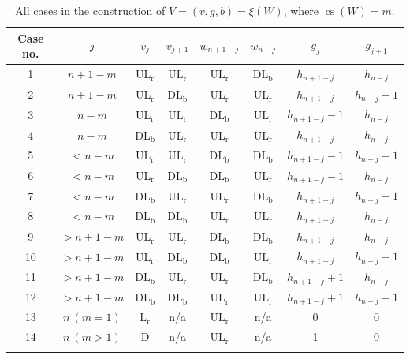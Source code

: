 \documentclass[12pt,reqno]{amsart}
\numberwithin{equation}{section}
\theoremstyle{plain}
\theoremstyle{definition}
\def\rD{\operatorname{D}}
\def\rLr{\operatorname{L_r}}
\def\ULr{\operatorname{UL_r}}
\def\DLb{\operatorname{DL_b}}
\def\cs{\operatorname{cs}}
\begin{document}
\renewcommand{\arraystretch}{1.4}
\begin{table}
{\small
\begin{tabular}{cccccccc}
\toprule
Case no. & $j$ & $v_j$ & $v_{j+1}$ & $w_{n+1-j}$ & $w_{n-j}$ & $g_j$ & $g_{j+1}$\\
\midrule
1 & $n+1-m$ & $\ULr$ & $\ULr$ & $\ULr$ & $\DLb$ & $h_{n+1-j}$ & $h_{n-j}$ \\

2 & $n+1-m$ & $\ULr$ & $\DLb$ & $\ULr$ & $\ULr$ & $h_{n+1-j}$ & $h_{n-j}+1$ \\

3 & $n-m$ & $\ULr$ & $\ULr$ & $\DLb$ & $\ULr$ & $h_{n+1-j}-1$ & $h_{n-j}$ \\

4 & $n-m$ & $\DLb$ & $\ULr$ & $\ULr$ & $\ULr$ & $h_{n+1-j}$ & $h_{n-j}$ \\

5 & $<n-m$ & $\ULr$ & $\ULr$ & $\DLb$ & $\DLb$ & $h_{n+1-j}-1$ & $h_{n-j}-1$ \\

6 & $<n-m$ & $\ULr$ & $\DLb$ & $\DLb$ & $\ULr$ & $h_{n+1-j}-1$ & $h_{n-j}$ \\

7 & $<n-m$ & $\DLb$ & $\ULr$ & $\ULr$ & $\DLb$ & $h_{n+1-j}$ & $h_{n-j}-1$ \\

8 & $<n-m$ & $\DLb$ & $\DLb$ & $\ULr$ & $\ULr$ & $h_{n+1-j}$ & $h_{n-j}$ \\

9 & $>n+1-m$ & $\ULr$ & $\ULr$ & $\DLb$ & $\DLb$ & $h_{n+1-j}$ & $h_{n-j}$ \\

10 & $>n+1-m$ & $\ULr$ & $\DLb$ & $\DLb$ & $\ULr$ & $h_{n+1-j}$ & $h_{n-j}+1$ \\

11 & $>n+1-m$ & $\DLb$ & $\ULr$ & $\ULr$ & $\DLb$ & $h_{n+1-j}+1$ & $h_{n-j}$ \\

12 & $>n+1-m$ & $\DLb$ & $\DLb$ & $\ULr$ & $\ULr$ & $h_{n+1-j}+1$ & $h_{n-j}+1$ \\

13 & $n \: (m=1)$ & $\rLr$ & n/a & $\ULr$ & n/a & 0 & 0 \\

14 & $n \: (m>1)$ & $\rD$ & n/a & $\ULr$ & n/a & 1 & 0  \\
\bottomrule\\
\end{tabular}
}
\caption{All cases in the construction of $V=(v,g,b)=\xi(W)$, where $\cs(W)=m$.}\label{xsi-cases}
\end{table}
\end{document}
